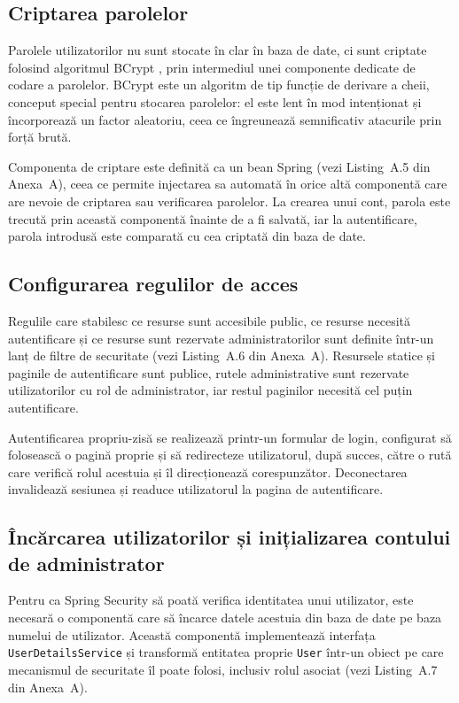 \subsection{Criptarea parolelor}
\label{subsec:bcrypt}

Parolele utilizatorilor nu sunt stocate în clar în baza de date, ci sunt
criptate folosind algoritmul BCrypt \cite{BCrypt}, prin intermediul unei
componente dedicate de codare a parolelor. BCrypt este un algoritm de tip
funcție de derivare a cheii, conceput special pentru stocarea parolelor: el
este lent în mod intenționat și încorporează un factor aleatoriu, ceea ce
îngreunează semnificativ atacurile prin forță brută.

Componenta de criptare este definită ca un bean Spring (vezi Listing~A.5 din
Anexa~A), ceea ce permite injectarea sa automată în orice altă componentă
care are nevoie de criptarea sau verificarea parolelor. La crearea unui cont,
parola este trecută prin această componentă înainte de a fi salvată, iar la
autentificare, parola introdusă este comparată cu cea criptată din baza de
date.

\subsection{Configurarea regulilor de acces}
\label{subsec:reguli-acces}

Regulile care stabilesc ce resurse sunt accesibile public, ce resurse necesită
autentificare și ce resurse sunt rezervate administratorilor sunt definite
într-un lanț de filtre de securitate (vezi Listing~A.6 din Anexa~A).
Resursele statice și paginile de autentificare sunt publice, rutele
administrative sunt rezervate utilizatorilor cu rol de administrator, iar
restul paginilor necesită cel puțin autentificare.

Autentificarea propriu-zisă se realizează printr-un formular de login,
configurat să folosească o pagină proprie și să redirecteze utilizatorul,
după succes, către o rută care verifică rolul acestuia și îl direcționează
corespunzător. Deconectarea invalidează sesiunea și readuce utilizatorul la
pagina de autentificare.

\subsection{Încărcarea utilizatorilor și inițializarea contului de administrator}
\label{subsec:init-admin}

Pentru ca Spring Security să poată verifica identitatea unui utilizator, este
necesară o componentă care să încarce datele acestuia din baza de date pe
baza numelui de utilizator. Această componentă implementează interfața
\texttt{UserDetailsService} și transformă entitatea proprie \texttt{User}
într-un obiect pe care mecanismul de securitate îl poate folosi, inclusiv
rolul asociat (vezi Listing~A.7 din Anexa~A).

